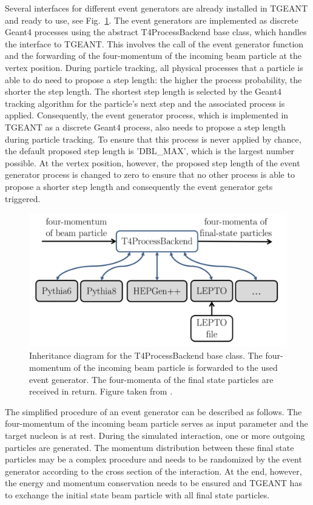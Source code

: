Several interfaces for different event generators are already installed in TGEANT and ready to use, see Fig.~\ref{pic:Processbackend}. The event generators are implemented as discrete Geant4 processes using the abstract T4ProcessBackend base class, which handles the interface to TGEANT. This involves the call of the event generator function and the forwarding of the four-momentum of the incoming beam particle at the vertex position.
During particle tracking, all physical processes that a particle is able to do need to propose a step length: the higher the process probability, the shorter the step length. The shortest step length is selected by the Geant4 tracking algorithm for the particle’s next step and the associated process is applied. Consequently, the event generator process, which is implemented in TGEANT as a discrete Geant4 process, also needs to propose a step length during particle tracking. To ensure that this process is never applied by chance, the default proposed step length is 'DBL\_MAX', which is the largest number possible. At the vertex position, however, the proposed step length of the event generator process is changed to zero to ensure that no other process is able to propose a shorter step length and consequently the event generator gets triggered.

\begin{figure}[!h]
  \centering
	\includegraphics[scale=0.5]{./gfx/Processbackend.png}
	\caption{Inheritance diagram for the T4ProcessBackend base class. The four- momentum of the incoming beam particle is forwarded to the used event generator. The four-momenta of the final state particles are received in return. Figure taken from \cite{Tobias}.}
	\label{pic:Processbackend}
\end{figure}

The simplified procedure of an event generator can be described as follows. The four-momentum of the incoming beam particle serves as input parameter and the target nucleon is at rest. During the simulated interaction, one or more outgoing particles are generated. The momentum distribution between these final state particles may be a complex procedure and needs to be randomized by the event generator according to the cross section of the interaction. At the end, however, the energy and momentum conservation needs to be ensured and TGEANT has to exchange the initial state beam particle with all final state particles.


